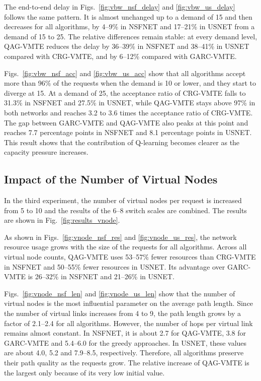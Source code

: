 The end-to-end delay in Figs.~\ref{fig:vbw_nsf_delay} and \ref{fig:vbw_us_delay} follows the same pattern. It is almost unchanged up to a demand of 15 and then decreases for all algorithms, by 4--9\% in NSFNET and 17--21\% in USNET from a demand of 15 to 25. The relative differences remain stable: at every demand level, QAG-VMTE reduces the delay by 36--39\% in NSFNET and 38--41\% in USNET compared with CRG-VMTE, and by 6--12\% compared with GARC-VMTE.

Figs.~\ref{fig:vbw_nsf_acc} and \ref{fig:vbw_us_acc} show that all algorithms accept more than 96\% of the requests when the demand is 10 or lower, and they start to diverge at 15. At a demand of 25, the acceptance ratio of CRG-VMTE falls to 31.3\% in NSFNET and 27.5\% in USNET, while QAG-VMTE stays above 97\% in both networks and reaches 3.2 to 3.6 times the acceptance ratio of CRG-VMTE. The gap between GARC-VMTE and QAG-VMTE also peaks at this point and reaches 7.7 percentage points in NSFNET and 8.1 percentage points in USNET. This result shows that the contribution of Q-learning becomes clearer as the capacity pressure increases.

\subsection{Impact of the Number of Virtual Nodes}
\label{subsec:vnode}

In the third experiment, the number of virtual nodes per request is increased from 5 to 10 and the results of the 6--8 switch scales are combined. The results are shown in Fig.~\ref{fig:results_vnode}.

As shown in Figs.~\ref{fig:vnode_nsf_res} and \ref{fig:vnode_us_res}, the network resource usage grows with the size of the requests for all algorithms. Across all virtual node counts, QAG-VMTE uses 53--57\% fewer resources than CRG-VMTE in NSFNET and 50--55\% fewer resources in USNET. Its advantage over GARC-VMTE is 26--32\% in NSFNET and 21--26\% in USNET.

Figs.~\ref{fig:vnode_nsf_len} and \ref{fig:vnode_us_len} show that the number of virtual nodes is the most influential parameter on the average path length. Since the number of virtual links increases from 4 to 9, the path length grows by a factor of 2.1--2.4 for all algorithms. However, the number of hops per virtual link remains almost constant. In NSFNET, it is about 2.7 for QAG-VMTE, 3.8 for GARC-VMTE and 5.4--6.0 for the greedy approaches. In USNET, these values are about 4.0, 5.2 and 7.9--8.5, respectively. Therefore, all algorithms preserve their path quality as the requests grow. The relative increase of QAG-VMTE is the largest only because of its very low initial value.


